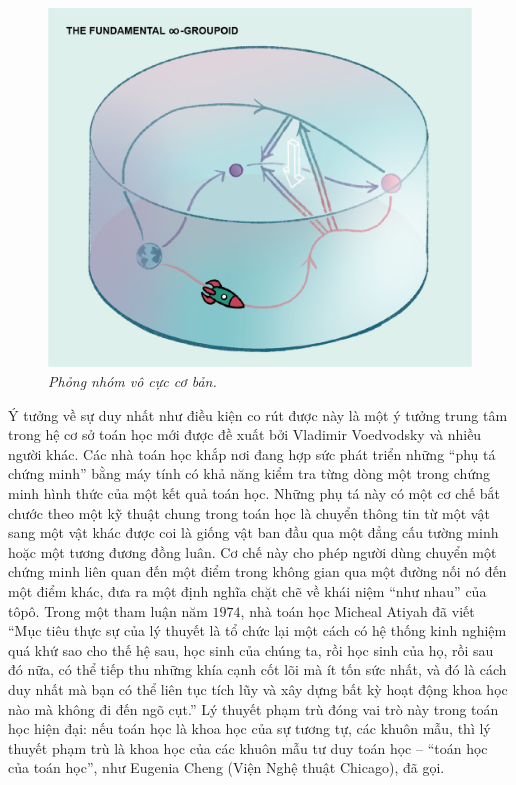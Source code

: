 \begin{multicols}{2}
\begin{figure}[H]
		\includegraphics[width=1\linewidth]{10}
		\caption{\small\textit{\color{duongvaotoanhoc}Phỏng nhóm vô cực cơ bản.}}
		\vspace*{-10pt}
	\end{figure}
	Ý tưởng về sự duy nhất như điều kiện co rút được này là một ý tưởng trung tâm trong hệ cơ sở toán học mới được đề xuất bởi Vladimir Voedvodsky và nhiều người khác. Các nhà toán học khắp nơi đang hợp sức phát triển những ``phụ tá chứng minh'' bằng máy tính có khả năng kiểm tra từng dòng một trong chứng minh hình thức của một kết quả toán học. Những phụ tá này có một cơ chế bắt chước theo một kỹ thuật chung trong toán học là chuyển thông tin từ một vật sang một vật khác được coi là giống vật ban đầu qua một đẳng cấu tường minh hoặc một tương đương đồng luân. Cơ chế này cho phép người dùng chuyển một chứng minh liên quan đến một điểm trong không gian qua một đường nối nó đến một điểm khác, đưa ra một định nghĩa chặt chẽ về khái niệm ``như nhau'' của tôpô.
	\vskip 0.1cm
	Trong một tham luận năm $1974$, nhà toán học Micheal Atiyah đã viết ``Mục tiêu thực sự của lý thuyết là tổ chức lại một cách có hệ thống kinh nghiệm quá khứ sao cho thế hệ sau, học sinh của chúng ta, rồi học sinh của họ, rồi sau đó nữa, có thể tiếp thu những khía cạnh cốt lõi mà ít tốn sức nhất, và đó là cách duy nhất mà bạn có thể liên tục tích lũy và xây dựng bất kỳ hoạt động khoa học nào mà không đi đến ngõ cụt.'' Lý thuyết phạm trù đóng vai trò này trong toán học hiện đại: nếu toán học là khoa học của sự tương tự, các khuôn mẫu, thì lý thuyết phạm trù là khoa học của các khuôn mẫu tư duy toán học -- ``toán học của toán học'', như Eugenia Cheng (Viện Nghệ thuật Chicago), đã gọi.

\end{multicols}
